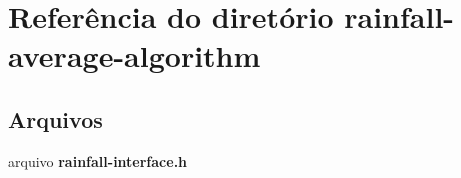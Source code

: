 \section{Referência do diretório rainfall-\/average-\/algorithm}
\label{dir_6a3ae3af5ad0287329f5a10bdfb3fbd8}
\subsection*{Arquivos}
\begin{DoxyCompactItemize}
\item 
arquivo {\bf rainfall-\/interface.\+h}
\end{DoxyCompactItemize}
